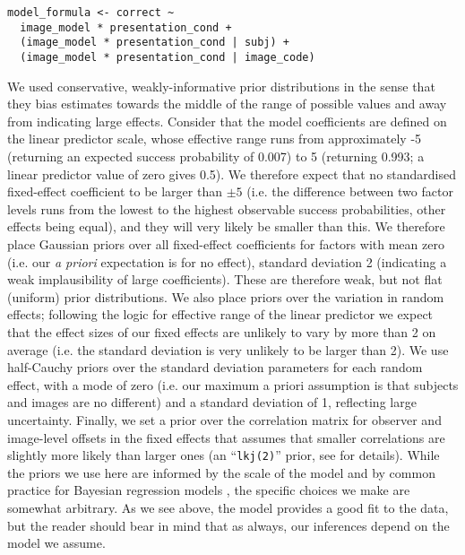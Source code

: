 \documentclass[doc, 11pt,a4paper,natbib]{apa6}\usepackage[]{graphicx}\usepackage[]{color}
\begin{document}
\begin{small}
\begin{verbatim}
model_formula <- correct ~ 
  image_model * presentation_cond +
  (image_model * presentation_cond | subj) +
  (image_model * presentation_cond | image_code)
\end{verbatim}
\end{small}

We used conservative, weakly-informative prior distributions in the sense that they bias estimates towards the middle of the range of possible values and away from indicating large effects.
Consider that the model coefficients are defined on the linear predictor scale, whose effective range runs from approximately -5 (returning an expected success probability of 0.007) to 5 (returning 0.993; a linear predictor value of zero gives 0.5).
We therefore expect that no standardised fixed-effect coefficient to be larger than $\pm 5$ (i.e. the difference between two factor levels runs from the lowest to the highest observable success probabilities, other effects being equal), and they will very likely be smaller than this.
We therefore place Gaussian priors over all fixed-effect coefficients for factors with mean zero (i.e. our \textit{a priori} expectation is for no effect), standard deviation 2 (indicating a weak implausibility of large coefficients).
These are therefore weak, but not flat (uniform) prior distributions.
We also place priors over the variation in random effects; following the logic for effective range of the linear predictor we expect that the effect sizes of our fixed effects are unlikely to vary by more than 2 on average (i.e. the standard deviation is very unlikely to be larger than 2).
We use half-Cauchy priors \citep[i.e. with a lower-bound of zero, as recommended by][]{gelman_data_2007} over the standard deviation parameters for each random effect, with a mode of zero (i.e. our maximum a priori assumption is that subjects and images are no different) and a standard deviation of 1, reflecting large uncertainty.
Finally, we set a prior over the correlation matrix for observer and image-level offsets in the fixed effects that assumes that smaller correlations are slightly more likely than larger ones (an ``\texttt{lkj(2)}'' prior, see \citet{lewandowski_generating_2009, standevelopmentteam_stan_2015-1} for details).
While the priors we use here are informed by the scale of the model and by common practice for Bayesian regression models \citep[see for example][]{kruschke_doing_2011,gelman_prior_2006,gelman_data_2007}, the specific choices we make are somewhat arbitrary.
As we see above, the model provides a good fit to the data, but the reader should bear in mind that as always, our inferences depend on the model we assume.
\end{document}
